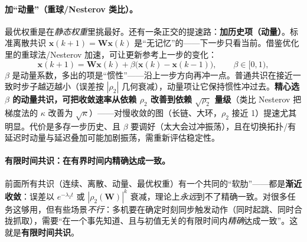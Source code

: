\paragraph{加“动量”（重球/Nesterov 类比）。}
最优权重是在\emph{静态权重}里挑最好。还有一条正交的提速路：\textbf{加历史项（动量）}。标准离散共识 $\mathbf{x}(k{+}1)=\mathbf{W}\mathbf{x}(k)$ 是“无记忆”的——下一步只看当前。借鉴优化里的重球法/Nesterov 加速，可让更新参考上一步的变化：
\begin{equation}
  \mathbf{x}(k{+}1)=\mathbf{W}\mathbf{x}(k)+\beta\big(\mathbf{x}(k)-\mathbf{x}(k{-}1)\big),\qquad \beta\in[0,1),
  \label{eq:cs-momentum}
\end{equation}
$\beta$ 是动量系数，多出的项是“惯性”——沿上一步方向再冲一点。普通共识在接近一致时步子越迈越小（误差按 $|\rho_2|$ 几何衰减），动量项让它保持惯性冲过去。\textbf{精心选 $\beta$ 的动量共识，可把收敛速率从依赖 $\rho_2$ 改善到依赖 $\sqrt{\rho_2}$ 量级}（类比 Nesterov 把梯度法的 $\kappa$ 改善为 $\sqrt\kappa$）——对慢收敛的图（长链、大环，$\rho_2$ 接近 1）提速尤其明显。代价是多存一步历史、且 $\beta$ 要调好（太大会过冲振荡），且在切换拓扑/有延迟时动量与延迟叠加可能加剧振荡，需重新评估稳定性。

\paragraph{有限时间共识：在有界时间内精确达成一致。}
前面所有共识（连续、离散、动量、最优权重）有一个共同的“软肋”——都是\textbf{渐近收敛}：误差以 $e^{-\lambda_2 t}$ 或 $|\rho_2(\mathbf{W})|^k$ 衰减，理论上\emph{永远}到不了精确一致。对很多任务这够用，但有些场景\emph{不行}：多机要在确定时刻同步触发动作（同时起跳、同时合拢抓取），需要“在一个事先知道、且与初值无关的有限时间内\emph{精确}达成一致”。这就是\textbf{有限时间共识}。

